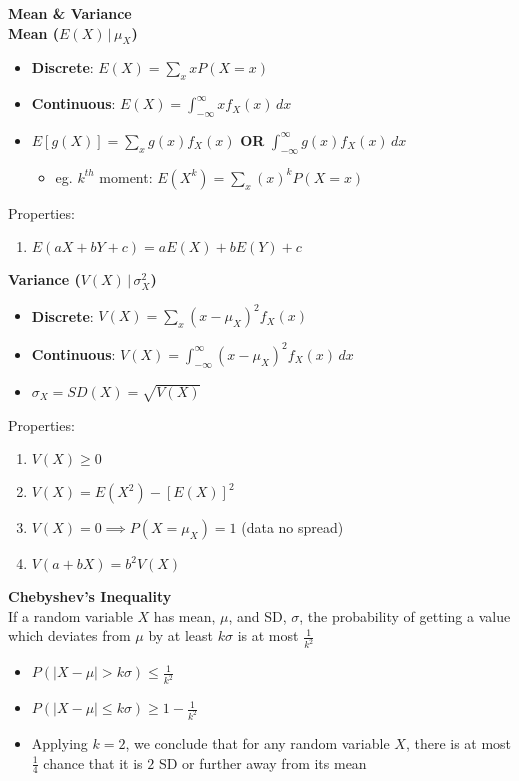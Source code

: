 \documentclass[a4paper, 12pt]{article}
\begin{document}
\begin{multicols*}{4}
\medskip

{\small\textbf{Mean \& Variance}} \\
\textbf{Mean ($E(X) \,|\, \mu_X$)}
\begin{itemize}
    \item \textbf{Discrete}: $E(X) = \sum_{x} xP(X = x)$
    \item \textbf{Continuous}: $E(X) = \int_{-\infty}^{\infty} xf_X(x) \, dx$
    \item $E[g(X)] = \sum_x g(x) f_X(x)$ \textbf{OR} $\int_{-\infty}^{\infty}g(x)f_X(x) \, dx$ 
    \begin{itemize}
        \item eg. $k^{th}$ moment: $E(X^k) = \sum_{x} (x)^kP(X = x)$
    \end{itemize}
\end{itemize}
Properties:
\begin{enumerate}
    \item $E(aX + bY +c) = aE(X) + bE(Y) + c$
\end{enumerate}
\textbf{Variance ($V(X) \,|\, \sigma^2_X$)}
\begin{itemize}
    \item \textbf{Discrete}: $V(X) = \sum_x (x - \mu_X)^2f_X(x)$
    \item \textbf{Continuous}: $V(X) = \int_{-\infty}^{\infty}(x - \mu_X)^2f_X(x) \, dx$
    \item $\sigma_X = SD(X) = \sqrt{V(X)}$
\end{itemize}
Properties:
\begin{enumerate}
    \item $V(X) \geq 0$
    \item $V(X) = E(X^2) - [E(X)]^2$
    \item $V(X) = 0 \implies P(X = \mu_X) = 1$ (data no spread)
    \item $V(a + bX) = b^2V(X)$
\end{enumerate}
\textbf{Chebyshev's Inequality} \\
If a random variable $X$ has mean, $\mu$, and SD, $\sigma$, the probability of
getting a value which deviates from $\mu$ by at least $k\sigma$ is at most $\frac{1}{k^2}$
\begin{itemize}
    \item $P(|X - \mu| > k\sigma) \leq \frac{1}{k^2}$
    \item $P(|X - \mu| \leq k\sigma) \geq 1 - \frac{1}{k^2}$
    \item Applying $k = 2$, we conclude that for any random variable $X$, there is at
    most $\frac{1}{4}$ chance that it is $2$ SD or further away
    from its mean
\end{itemize}


\end{multicols*}
\end{document}
